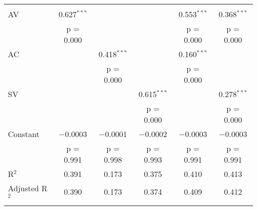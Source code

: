 
\begin{tabular}{@{\extracolsep{5pt}}lccccc} 
\\[-1.8ex]
\hline \\[-1.8ex] 
AV & 0.627$^{***}$ &  &  & 0.553$^{***}$ & 0.368$^{***}$ \\ 
& p = 0.000 &  &  & p = 0.000 & p = 0.000 \\ 
AC &  & 0.418$^{***}$ &  & 0.160$^{***}$ &  \\ 
&  & p = 0.000 &  & p = 0.000 &  \\ 
SV &  &  & 0.615$^{***}$ &  & 0.278$^{***}$ \\ 
&  &  & p = 0.000 &  & p = 0.000 \\ 
Constant & $-$0.0003 & $-$0.0001 & $-$0.0002 & $-$0.0003 & $-$0.0003 \\ 
& p = 0.991 & p = 0.998 & p = 0.993 & p = 0.991 & p = 0.991 \\ 
R$^{2}$ & 0.391 & 0.173 & 0.375 & 0.410 & 0.413 \\ 
Adjusted R$^{2}$ & 0.390 & 0.173 & 0.374 & 0.409 & 0.412 \\ 
\hline \\[-1.8ex] 
\end{tabular} 
